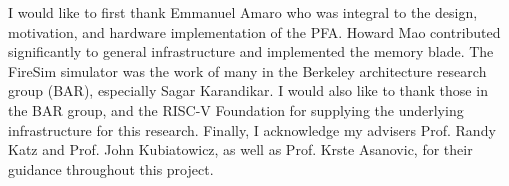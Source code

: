 I would like to first thank Emmanuel Amaro who was integral to the design,
motivation, and hardware implementation of the PFA. Howard Mao contributed
significantly to general infrastructure and implemented the memory blade. The
FireSim simulator was the work of many in the Berkeley architecture research
group (BAR), especially Sagar Karandikar. I would also like to thank those in
the BAR group, and the RISC-V Foundation for supplying the underlying
infrastructure for this research.  Finally, I acknowledge my advisers Prof.
Randy Katz and Prof. John Kubiatowicz, as well as Prof. Krste Asanovic, for
their guidance throughout this project. 
